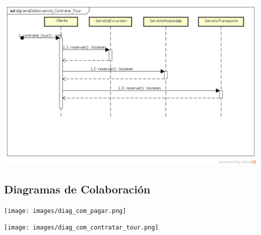 \documentclass[12pt,a4paper]{article}
\begin{document}
		\includegraphics[scale=0.6]{digramaDeSecuencia_Contratar_Tour.png}

	\subsection{Diagramas de Colaboración}
		\texttt{[image: images/diag\_com\_pagar.png]}

		\texttt{[image: images/diag\_com\_contratar\_tour.png]}
\end{document}
